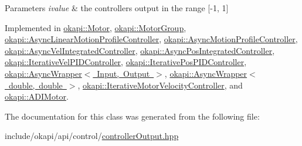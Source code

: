 \begin{DoxyParams}{Parameters}
{\em ivalue} & the controller\textquotesingle{}s output in the range {\ttfamily \mbox{[}-\/1, 1\mbox{]}} \\
\hline
\end{DoxyParams}


Implemented in \mbox{\hyperlink{classokapi_1_1Motor_a262c36a80a942d125e574d691b77b440}{okapi\+::\+Motor}}, \mbox{\hyperlink{classokapi_1_1MotorGroup_a9da308795bb956d5f7f3f7885a727d8e}{okapi\+::\+Motor\+Group}}, \mbox{\hyperlink{classokapi_1_1AsyncLinearMotionProfileController_a45b62483002333a2d99deea8de2af43e}{okapi\+::\+Async\+Linear\+Motion\+Profile\+Controller}}, \mbox{\hyperlink{classokapi_1_1AsyncMotionProfileController_a292b22f53ed0ef67a479e00c92f68e3f}{okapi\+::\+Async\+Motion\+Profile\+Controller}}, \mbox{\hyperlink{classokapi_1_1AsyncVelIntegratedController_ae50c09f44077284278e4d8a80656077d}{okapi\+::\+Async\+Vel\+Integrated\+Controller}}, \mbox{\hyperlink{classokapi_1_1AsyncPosIntegratedController_aaa8d694c814e7b419dfb55b3e3a1d72e}{okapi\+::\+Async\+Pos\+Integrated\+Controller}}, \mbox{\hyperlink{classokapi_1_1IterativeVelPIDController_a50c069752036261395871fbe175ae101}{okapi\+::\+Iterative\+Vel\+P\+I\+D\+Controller}}, \mbox{\hyperlink{classokapi_1_1IterativePosPIDController_ab77771ba39d01e5f8d29984fd43abd38}{okapi\+::\+Iterative\+Pos\+P\+I\+D\+Controller}}, \mbox{\hyperlink{classokapi_1_1AsyncWrapper_aec6d1a4214bad2151bee23dc5e8076e7}{okapi\+::\+Async\+Wrapper$<$ Input, Output $>$}}, \mbox{\hyperlink{classokapi_1_1AsyncWrapper_aec6d1a4214bad2151bee23dc5e8076e7}{okapi\+::\+Async\+Wrapper$<$ double, double $>$}}, \mbox{\hyperlink{classokapi_1_1IterativeMotorVelocityController_a5a36064df12b3d34f2bfa09ca1992b9e}{okapi\+::\+Iterative\+Motor\+Velocity\+Controller}}, and \mbox{\hyperlink{classokapi_1_1ADIMotor_ac290a47e904c728ff1e61ee85408a1be}{okapi\+::\+A\+D\+I\+Motor}}.



The documentation for this class was generated from the following file\+:\begin{DoxyCompactItemize}
\item 
include/okapi/api/control/\mbox{\hyperlink{controllerOutput_8hpp}{controller\+Output.\+hpp}}\end{DoxyCompactItemize}

